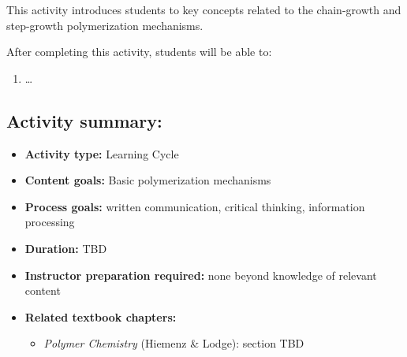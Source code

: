 %
%
%
%

\renewcommand{\figpath}{content/intro/chain-and-step/figs}
\renewcommand{\labelbase}{chain-and-step}

\begin{activity}

\begin{instructornotes}

	This activity introduces students to key concepts related to the chain-growth and step-growth polymerization mechanisms.
	
	After completing this activity, students will be able to:
			\begin{enumerate}
				\item \dots
			\end{enumerate}
			
	\subsection*{Activity summary:}
	\begin{itemize}
		\item \textbf{Activity type:} Learning Cycle
		\item \textbf{Content goals:} Basic polymerization mechanisms
		\item \textbf{Process goals:} %
			written communication, critical thinking, information processing
		\item \textbf{Duration:} TBD
		\item \textbf{Instructor preparation required:} none beyond knowledge of relevant content
		\item \textbf{Related textbook chapters:}
			\begin{itemize}
				\item \emph{Polymer Chemistry} (Hiemenz \& Lodge): section TBD%
			\end{itemize}
	\end{itemize}


\end{instructornotes}
\end{activity}
